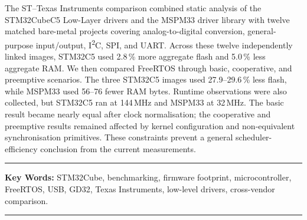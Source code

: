The ST--Texas Instruments comparison combined static analysis of the STM32CubeC5 Low-Layer
drivers and the MSPM33 driver library with twelve matched bare-metal projects covering
analog-to-digital conversion, general-purpose input/output, I\textsuperscript{2}C, SPI, and
UART. Across these twelve independently linked images, STM32C5 used 2.8\,\% more aggregate
flash and 5.0\,\% less aggregate RAM. We then compared FreeRTOS through basic, cooperative,
and preemptive scenarios. The three STM32C5 images used 27.9--29.6\,\% less flash, while
MSPM33 used 56--76 fewer RAM bytes. Runtime observations were also collected, but STM32C5
ran at 144\,MHz and MSPM33 at 32\,MHz. The basic result became nearly equal after clock
normalisation; the cooperative and preemptive results remained affected by kernel
configuration and non-equivalent synchronisation primitives. These constraints prevent a
general scheduler-efficiency conclusion from the current measurements.

\noindent\rule[2pt]{\textwidth}{0.5pt}

{\textbf{Key Words:}}
STM32Cube, benchmarking, firmware footprint, microcontroller, FreeRTOS, USB, GD32, Texas Instruments, low-level drivers, cross-vendor comparison.
\\
\noindent\rule[2pt]{\textwidth}{0.5pt}